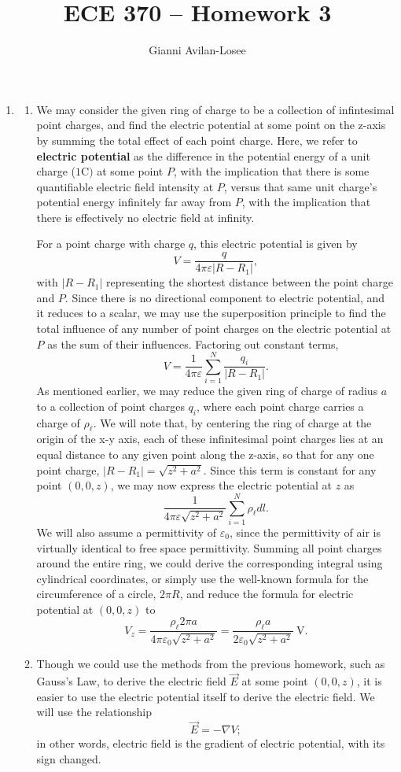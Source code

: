 \documentclass{article}
\title{ECE 370 -- Homework 3}
\author{Gianni Avilan-Losee}
\begin{document}

\begin{enumerate}
	\item
		\begin{enumerate}[label=\alph*)]
			\item
				We may consider the given ring of charge to be a collection of infintesimal point charges, and find the electric potential at some point on the z-axis by summing the total effect of each point charge. 
				Here, we refer to \textbf{electric potential} as the difference in the potential energy of a unit charge (\(1\mathrm{C})\) at some point \(P\), with the implication that there is some quantifiable electric field intensity at \(P\), versus that same unit charge's potential energy infinitely far away from \(P\), with the implication that there is effectively no electric field at infinity.

				For a point charge with charge \(q\), this electric potential is given by \[
				  V = \frac{q}{4\pi\varepsilon|R-R_1|},
				\]
				with \(|R-R_1|\) representing the shortest distance between the point charge and \(P\). Since there is no directional component to electric potential, and it reduces to a scalar, we may use the superposition principle to find the total influence of any number of point charges on the electric potential at \(P\) as the sum of their influences. Factoring out constant terms, \[
				  V = \frac{1}{4\pi\varepsilon}\sum_{i=1}^{N}\frac{q_i}{|R-R_1|}.
				\]
		As mentioned earlier, we may reduce the given ring of charge of radius \(a\) to a collection of point charges \(q_i\), where each point charge carries a charge of \(\rho_\ell\). We will note that, by centering the ring of charge at the origin of the x-y axis, each of these infinitesimal point charges lies at an equal distance to any given point along the z-axis, so that for any one point charge, \(|R-R_1| = \sqrt{z^2 + a^2}\). Since this term is constant for any point \((0,0,z)\), we may now express the electric potential at \(z\) as \[
			\frac{1}{4\pi\varepsilon \sqrt{z^2 + a^2}} \sum_{i=1}^{N} \rho_{\ell} dl.
		\]
		We will also assume a permittivity of \(\varepsilon_0\), since the permittivity of air is virtually identical to free space permittivity.  Summing all point charges around the entire ring, we could derive the corresponding integral using cylindrical coordinates, or simply use the well-known formula for the circumference of a circle, \(2\pi R\), and reduce the formula for electric potential at \((0,0,z)\) to \[
			V_z = \frac{\rho_{\ell}2\pi a}{4\pi\varepsilon_0 \sqrt{z^2+a^2}} = \frac{\rho_\ell a}{2\varepsilon_0 \sqrt{z^2+a^2}} \ \mathrm{V}.
		\]
	\item Though we could use the methods from the previous homework, such as Gauss's Law, to derive the electric field \(\vec{E}\) at some point \((0,0,z)\), it is easier to use the electric potential itself to derive the electric field. We will use the relationship \[
	  \vec{E} = -\nabla V;
	\] 
	in other words, electric field is the gradient of electric potential, with its sign changed. 
	

\end{enumerate}
\end{enumerate}
\end{document}
